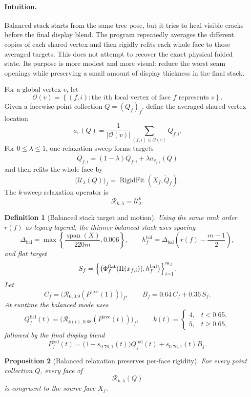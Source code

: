 \documentclass[11pt]{article}
\newtheorem{definition}{Definition}[section]
\newtheorem{proposition}[definition]{Proposition}
\theoremstyle{remark}
\newcommand{\abs}[1]{\left\lvert #1 \right\rvert}
\newcommand{\set}[1]{\left\{ #1 \right\}}
\begin{document}
\paragraph{Intuition.}
Balanced stack starts from the same tree pose, but it tries to heal visible
cracks before the final display blend. The program repeatedly averages the
different copies of each shared vertex and then rigidly refits each whole face
to those averaged targets. This does not attempt to recover the exact physical
folded state. Its purpose is more modest and more visual: reduce the worst seam
openings while preserving a small amount of display thickness in the final
stack.

For a global vertex $v$, let
\[
\mathcal O(v)=
\set{(f,i):\text{the $i$th local vertex of face $f$ represents }v}.
\]
Given a facewise point collection $Q=(Q_f)_f$, define the averaged shared
vertex location
\[
a_v(Q)
=
\frac{1}{\abs{\mathcal O(v)}}
\sum_{(f,i)\in\mathcal O(v)}Q_{f,i}.
\]
For $0\le\lambda\le1$, one relaxation sweep forms targets
\[
\widetilde Q_{f,i}
=
(1-\lambda)Q_{f,i}+\lambda a_{v_{f,i}}(Q)
\]
and then refits the whole face by
\[
\bigl(\mathcal U_\lambda(Q)\bigr)_f
=
\operatorname{RigidFit}(X_f,\widetilde Q_f).
\]
The $k$-sweep relaxation operator is
\[
\mathcal R_{k,\lambda}
=
\mathcal U_\lambda^k.
\]

\begin{definition}[Balanced stack target and motion]
Using the same rank order $r(f)$ as legacy layered, the thinner balanced stack
uses spacing
\[
\Delta_{\mathrm{bal}}
=
\max\left\{
\frac{\operatorname{span}(X)}{220m},
0.006
\right\},
\qquad
h_f^{\mathrm{bal}}
=
\Delta_{\mathrm{bal}}
\left(r(f)-\frac{m-1}{2}\right),
\]
and flat target
\[
S_f
=
\Bigl\{
\bigl(\Phi_f^{\mathrm{flat}}(\Pi(x_{f,i})),h_f^{\mathrm{bal}}\bigr)
\Bigr\}_{i=1}^{m_f}.
\]
Let
\[
C_f
=
\bigl(\mathcal R_{6,0.9}(P^{\mathrm{tree}}(1))\bigr)_f,
\qquad
B_f
=
0.64\,C_f+0.36\,S_f.
\]
At runtime the balanced mode uses
\[
Q_f^{\mathrm{bal}}(t)
=
\bigl(\mathcal R_{k(t),0.88}(P^{\mathrm{tree}}(t))\bigr)_f,
\qquad
k(t)=
\begin{cases}
4,& t<0.65,\\
5,& t\ge 0.65,
\end{cases}
\]
followed by the final display blend
\[
P_f^{\mathrm{bal}}(t)
=
\bigl(1-s_{0.76,1}(t)\bigr)Q_f^{\mathrm{bal}}(t)
+
s_{0.76,1}(t)B_f.
\]
\end{definition}

\begin{proposition}[Balanced relaxation preserves per-face rigidity]
For every point collection $Q$, every face of
\[
\mathcal R_{k,\lambda}(Q)
\]
is congruent to the source face $X_f$.
\end{proposition}
\end{document}
